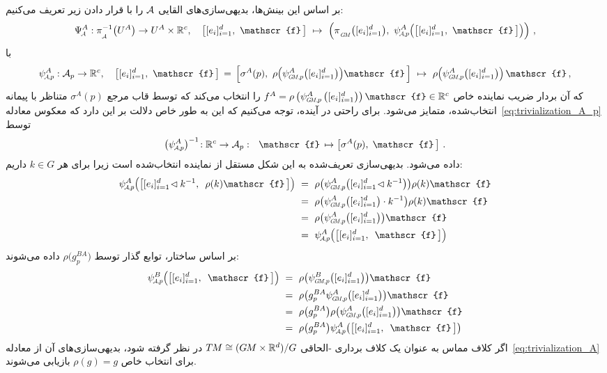 بر اساس این بینش‌ها، بدیهی‌سازی‌های القایی $\mathcal{A}$ را با قرار دادن زیر تعریف می‌کنیم:
\begin{align}\label{eq:trivialization_A}
	\PsiA^A: \piA^{-1}\big(U^A\big)\to U^A\times\R^c,\quad
	\big[[e_{i}]_{i=1}^d,\ \mathscr{f}\,\big]\ \mapsto\ 
	\Big(\piGM \big([e_{i}]_{i=1}^d \big),\ \psiAp^A \pig(\big[ [e_{i}]_{i=1}^d,\ \mathscr{f}\,\big]\pig) \Big) \ ,
\end{align}
با
\begin{align}\label{eq:trivialization_A_p}
	\psiAp^A:\A_p\to\R^c,\quad
	\big[[e_{i}]_{i=1}^d,\ \mathscr{f}\,\big]
	\, =\, \Big[\sigma^A(p),\ \rho\pig( \psiGMp^A \big([e_{i}]_{i=1}^d \big)\pig) \mathscr{f}\,\Big]
	\ \mapsto\ \rho\pig(\psiGMp^A \big([e_{i}]_{i=1}^d \big)\pig)\, \mathscr{f} \,,
\end{align}
که آن بردار ضریب نماینده خاص
$f^A = \rho\left(\psiGMp^A \left([e_{i}]_{i=1}^d\right)\right) \mathscr{f}\in\R^c$
را انتخاب می‌کند که توسط قاب مرجع $\sigma^A(p)$ متناظر با پیمانه انتخاب‌شده، متمایز می‌شود.
برای راحتی در آینده، توجه می‌کنیم که این به طور خاص دلالت بر این دارد که معکوس معادله~\eqref{eq:trivialization_A_p} توسط
\begin{align}\label{eq:trivialization_A_p_inv}
	\big(\psiAp^A\big)^{-1}\!: \R^c \to \A_p:\ \ 
	\mathscr{f} \,\mapsto \big[\sigma^A(p),\; \mathscr{f}\,\big] \ .
\end{align}
داده می‌شود. بدیهی‌سازی تعریف‌شده به این شکل مستقل از نماینده انتخاب‌شده است زیرا برای هر $k\in G$ داریم:
\begin{align}
	\psiAp^A \pig(\big[ [e_{i}]_{i=1}^d \!\lhd k^{-1},\,\ \rho(k)\mathscr{f} \,\big]\pig)
	\ &=\ \rho\big(\psiGMp^A \big([e_{i}]_{i=1}^d \!\lhd k^{-1} \big)\big) \rho(k)\mathscr{f} \notag\\
	\ &=\ \rho\big(\psiGMp^A \big([e_{i}]_{i=1}^d \big) \cdot k^{-1}\big) \rho(k)\mathscr{f} \notag\\
	\ &=\ \rho\big(\psiGMp^A \big([e_{i}]_{i=1}^d \big)\big) \mathscr{f} \notag\\
	\ &=\ \psiAp^A \pig(\big[ [e_{i}]_{i=1}^d,\,\ \mathscr{f}\,\big]\pig)
\end{align}
بر اساس ساختار، توابع گذار توسط $\rho\big(g_p^{BA}\big)$ داده می‌شوند:
\begin{align}\label{eq:transition_fct_A}
	\psiAp^B \pig(\big[ [e_{i}]_{i=1}^d,\,\ \mathscr{f}\, \big]\pig)
	\ &=\ \rho\big(\psiGMp^B \big([e_{i}]_{i=1}^d \big)\big) \mathscr{f} \notag\\
	\ &=\ \rho\big(g_p^{BA}\psiGMp^A \big([e_{i}]_{i=1}^d \big)\big) \mathscr{f} \notag\\
	\ &=\ \rho\big(g_p^{BA}\big) \rho\big(\psiGMp^A \big([e_{i}]_{i=1}^d \big)\big) \mathscr{f} \notag\\
	\ &=\ \rho\big(g_p^{BA}\big) \psiAp^A \big(\big[ [e_{i}]_{i=1}^d,\,\ \mathscr{f}\,\big]\big)
\end{align}
اگر کلاف مماس به عنوان یک کلاف برداری \lr{G}-الحاقی $T\mkern-1.5muM\cong(G\mkern-1.4muM\times\mathbb{R}^d)/G$ در نظر گرفته شود، بدیهی‌سازی‌های آن از معادله~\eqref{eq:trivialization_A} برای انتخاب خاص $\rho(g)=g$ بازیابی می‌شوند.


